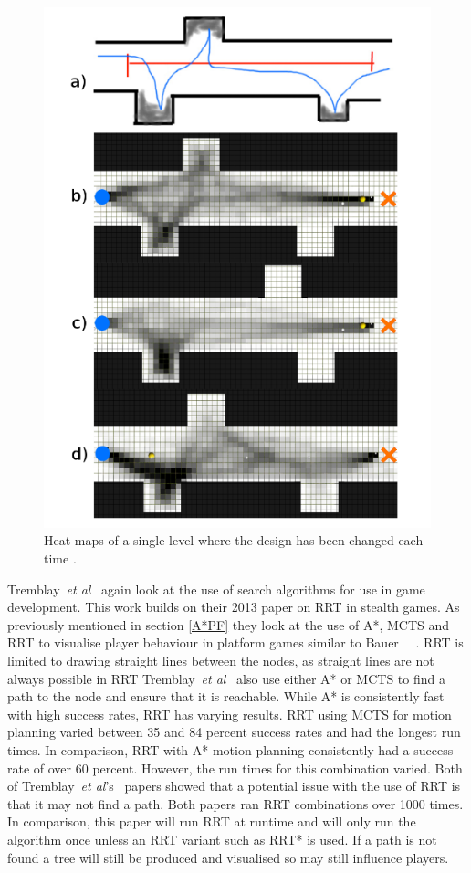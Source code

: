 \documentclass[journal]{IEEEtran}
\begin{document}
	\begin{figure}[h]
		\includegraphics[width=1.0\linewidth]{TremblayHeatMap.png}
		\caption{Heat maps of a single level where the design has been changed each time \cite{Tremblay2013}.}
		\label{TremblayHeatMap}
	\end{figure} 
	
	Tremblay~\textit{et al}~\cite{Tremblay2014} again look at the use of search algorithms for use in game development. This work builds on their 2013 paper on RRT in stealth games. As previously mentioned in section \ref{A*PF} they look at the use of A*, MCTS and RRT to visualise player behaviour in platform games similar to Bauer ~\cite{Tremblay2014}~\cite{bauer2012}.  RRT is limited to drawing straight lines between the nodes, as straight lines are not always possible in RRT Tremblay~\textit{et al}~\cite{Tremblay2014} also use either A* or MCTS to find a path to the node and ensure that it is reachable.
	While A* is consistently fast with high success rates, RRT has varying results. RRT using MCTS for motion planning varied between 35 and 84 percent success rates and had the longest run times. In comparison, RRT with A* motion planning consistently had a success rate of over 60 percent. However, the run times for this combination varied. 
	Both of Tremblay~\textit{et al}'s~\cite{Tremblay2014, Tremblay2013} papers showed that a potential issue with the use of RRT is that it may not find a path. Both papers ran RRT combinations over 1000 times. In comparison, this paper will run RRT at runtime and will only run the algorithm once unless an RRT variant such as RRT* is used. If a path is not found a tree will still be produced and visualised so may still influence players.
	
\end{document}
